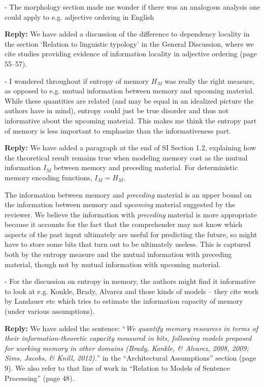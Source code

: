 \documentclass{article}[11pt,a4paper,oneside]
\newenvironment{reply}
  {\par\medskip
   \color{blue}%
   \begin{framed}
   \textbf{Reply: }\ignorespaces}
 {\end{framed}
  \medskip}
\begin{document}
- The morphology section made me wonder if there was an analogous analysis one could apply to e.g. adjective ordering in English

\begin{reply}
	We have added a discussion of the difference to dependency locality in the section `Relation to linguistic typology' in the General Discussion, where we cite studies providing evidence of information locality in adjective ordering (page 55--57).
\end{reply}

- I wondered throughout if entropy of memory $H_M$ was really the right measure, as opposed to e.g. mutual information between memory and upcoming material. While these quantities are related (and may be equal in an idealized picture the authors have in mind), entropy could just be true disorder and thus not informative about the upcoming material. This makes me think the entropy part of memory is less important to emphasize than the informativeness part.

\begin{reply}
We have added a paragraph at the end of SI Section 1.2, explaining how the theoretical result remains true when modeling memory cost as the mutual information $I_M$ between memory and preceding material. For deterministic memory encoding functions, $I_M=H_M$.

	The information between memory and \emph{preceding} material is an upper bound on the information between memory and \emph{upcoming} material suggested by the reviewer.
	We believe the information with \emph{preceding} material is more appropriate because it accounts for the fact that the comprehender may not know which aspects of the past input ultimately are useful for predicting the future, so might have to store some bits that turn out to be ultimately useless. This is captured both by the entropy measure and the mutual information with preceding material, though not by mutual information with upcoming material. 
\end{reply}

- For the discussion on entropy in memory, the authors might find it informative to look at e.g. Konkle, Brady, Alvarez and those kinds of models -- they cite work by Landauer etc which tries to estimate the information capacity of memory (under various assumptions).

\begin{reply}
	We have added the sentence: ``\textit{We
quantify memory resources in terms of their information-theoretic capacity measured in
bits, following models proposed for working memory in other domains (Brady, Konkle, \&
	Alvarez, 2008, 2009; Sims, Jacobs, \& Knill, 2012).}'' in the ``Architectural Assumptions'' section (page 9).
	We also refer to that line of work in ``Relation to Models of Sentence Processing'' (page 48).
\end{reply}
\end{document}

